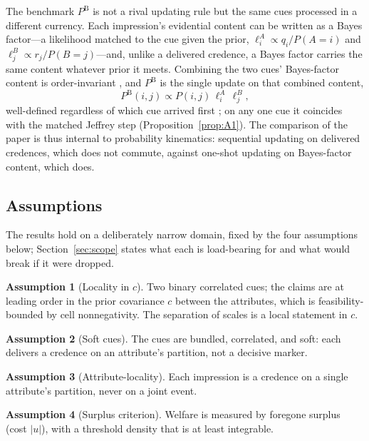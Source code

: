\documentclass[review,12pt,authoryear]{elsarticle}
\theoremstyle{remark}
\theoremstyle{definition}
\newtheorem{assumption}{Assumption}
\newcommand{\PB}{P^{\mathrm{B}}}
\newcommand{\anchor}[1]{}
\begin{document}
The benchmark $\PB$ is not a rival updating rule but the same cues processed in a different
currency. Each impression's evidential content can be written as a Bayes factor---a likelihood
matched to the cue given the prior, $\ell^{A}_{i}\propto q_{i}/P(A{=}i)$ and
$\ell^{B}_{j}\propto r_{j}/P(B{=}j)$---and, unlike a delivered credence, a Bayes factor carries
the same content whatever prior it meets. Combining the two cues' Bayes-factor content is
order-invariant \citep{Wagner2002}, and $\PB$ is the single update on that combined content,
\[
  \PB(i,j)\propto P(i,j)\,\ell^{A}_{i}\,\ell^{B}_{j},
\]
well-defined regardless of which cue arrived first \anchor{Setup}; on any one cue it coincides
with the matched Jeffrey step (Proposition~\ref{prop:A1}). The comparison of the paper is thus
internal to probability kinematics: sequential updating on delivered credences, which does not
commute, against one-shot updating on Bayes-factor content, which does.

\subsection{Assumptions}
\label{sec:assumptions}

The results hold on a deliberately narrow domain, fixed by the four assumptions below;
Section~\ref{sec:scope} states what each is load-bearing for and what would break if it were
dropped.

\begin{assumption}[Locality in $c$]\label{as:localc}
Two binary correlated cues; the claims are at leading order in the prior covariance $c$ between
the attributes, which is feasibility-bounded by cell nonnegativity. The separation of scales is
a local statement in $c$.
\end{assumption}

\begin{assumption}[Soft cues]\label{as:soft}
The cues are bundled, correlated, and soft: each delivers a credence on an attribute's partition,
not a decisive marker.
\end{assumption}

\begin{assumption}[Attribute-locality]\label{as:local}
Each impression is a credence on a single attribute's partition, never on a joint event.
\end{assumption}

\begin{assumption}[Surplus criterion]\label{as:surplus}
Welfare is measured by foregone surplus (cost $|u|$), with a threshold density that is at least
integrable.
\end{assumption}
\end{document}
